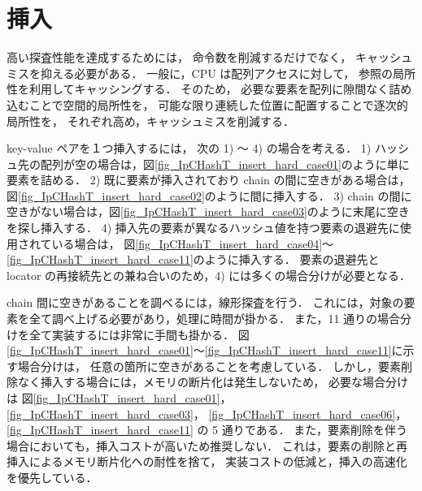 \section{挿入}

高い探査性能を達成するためには，
命令数を削減するだけでなく，
キャッシュミスを抑える必要がある．
一般に，CPU は配列アクセスに対して，
参照の局所性を利用してキャッシングする．
そのため，
必要な要素を配列に隙間なく詰め込むことで空間的局所性を，
可能な限り連続した位置に配置することで逐次的局所性を，
それぞれ高め，キャッシュミスを削減する．


key-value ペアを１つ挿入するには，
次の 1) 〜 4) の場合を考える．
1) ハッシュ先の配列が空の場合は，図\ref{fig_IpCHashT_insert_hard_case01}のように単に要素を詰める．
2) 既に要素が挿入されており chain の間に空きがある場合は，図\ref{fig_IpCHashT_insert_hard_case02}のように間に挿入する．
3) chain の間に空きがない場合は，図\ref{fig_IpCHashT_insert_hard_case03}のように末尾に空きを探し挿入する．
4) 挿入先の要素が異なるハッシュ値を持つ要素の退避先に使用されている場合は，
図\ref{fig_IpCHashT_insert_hard_case04}〜\ref{fig_IpCHashT_insert_hard_case11}のように挿入する．
要素の退避先と locator の再接続先との兼ね合いのため，4) には多くの場合分けが必要となる．

chain 間に空きがあることを調べるには，線形探査を行う．
これには，対象の要素を全て調べ上げる必要があり，処理に時間が掛かる．
また，11 通りの場合分けを全て実装するには非常に手間も掛かる．
図\ref{fig_IpCHashT_insert_hard_case01}〜\ref{fig_IpCHashT_insert_hard_case11}に示す場合分けは，
任意の箇所に空きがあることを考慮している．
しかし，要素削除なく挿入する場合には，メモリの断片化は発生しないため，
必要な場合分けは
図\ref{fig_IpCHashT_insert_hard_case01}，
\ref{fig_IpCHashT_insert_hard_case03}，
\ref{fig_IpCHashT_insert_hard_case06}，
\ref{fig_IpCHashT_insert_hard_case11}
の 5 通りである．
また，要素削除を伴う場合においても，挿入コストが高いため推奨しない．
これは，要素の削除と再挿入によるメモリ断片化への耐性を捨て，
実装コストの低減と，挿入の高速化を優先している．
\newpage


